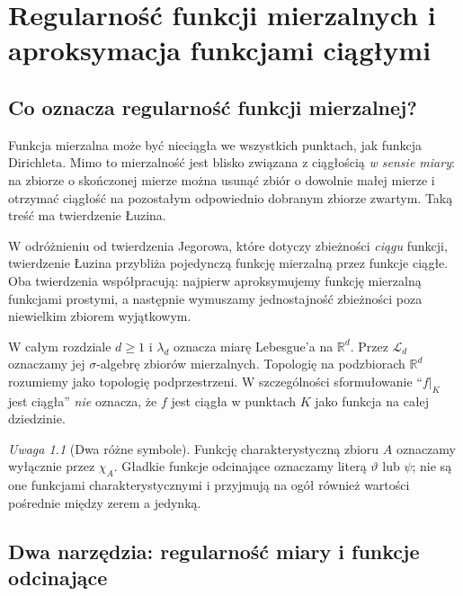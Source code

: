 \documentclass[11pt,a4paper,oneside]{book}
\numberwithin{equation}{chapter}
\theoremstyle{plain}
\theoremstyle{definition}
\theoremstyle{remark}
\newtheorem{uwaga}[twierdzenie]{Uwaga}
\begin{document}


\chapter[Regularność funkcji mierzalnych]{Regularność funkcji mierzalnych i aproksymacja funkcjami ciągłymi}
\label{ch:regularnosc-funkcji}

\section{Co oznacza regularność funkcji mierzalnej?}

Funkcja mierzalna może być nieciągła we wszystkich punktach,
jak funkcja Dirichleta. Mimo to mierzalność jest blisko
związana z ciągłością \emph{w sensie miary}: na zbiorze o
skończonej mierze można usunąć zbiór o dowolnie małej mierze
i otrzymać ciągłość na pozostałym odpowiednio dobranym
zbiorze zwartym. Taką treść ma twierdzenie Łuzina.

W odróżnieniu od twierdzenia Jegorowa, które dotyczy
zbieżności \emph{ciągu} funkcji, twierdzenie Łuzina
przybliża pojedynczą funkcję mierzalną przez funkcje
ciągłe. Oba twierdzenia współpracują: najpierw
aproksymujemy funkcję mierzalną funkcjami prostymi,
a następnie wymuszamy jednostajność zbieżności
poza niewielkim zbiorem wyjątkowym.

W całym rozdziale $d\ge1$ i $\lambda_d$ oznacza miarę
Lebesgue'a na $\mathbb R^d$. Przez $\mathcal L_d$
oznaczamy jej $\sigma$-algebrę zbiorów mierzalnych.
Topologię na podzbiorach $\mathbb R^d$ rozumiemy jako
topologię podprzestrzeni. W szczególności sformułowanie
``$f|_K$ jest ciągła'' \emph{nie} oznacza,
że $f$ jest ciągła w punktach $K$ jako funkcja na
całej dziedzinie.

\begin{uwaga}[Dwa różne symbole]
Funkcję charakterystyczną zbioru $A$ oznaczamy
wyłącznie przez $\chi_A$. Gładkie funkcje odcinające
oznaczamy literą $\vartheta$ lub $\psi$; nie są one
funkcjami charakterystycznymi i przyjmują na ogół
również wartości pośrednie między zerem a jedynką.
\end{uwaga}

\section{Dwa narzędzia: regularność miary i funkcje odcinające}
\end{document}
